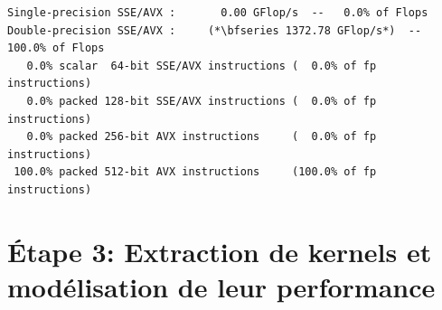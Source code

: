\begin{lstlisting}[caption=Résultat de l'outil \textit{myflops.sh} utilisé pour compter les instructions flottante exécutées sur un processeur., label={code:mygflops_512_output},
  basicstyle=\footnotesize, frame=tb,
  xleftmargin=.005\textwidth, xrightmargin=.005\textwidth]
Single-precision SSE/AVX :       0.00 GFlop/s  --   0.0% of Flops
Double-precision SSE/AVX :     (*\bfseries 1372.78 GFlop/s*)  -- 100.0% of Flops
   0.0% scalar  64-bit SSE/AVX instructions (  0.0% of fp instructions)
   0.0% packed 128-bit SSE/AVX instructions (  0.0% of fp instructions)
   0.0% packed 256-bit AVX instructions     (  0.0% of fp instructions)
 100.0% packed 512-bit AVX instructions     (100.0% of fp instructions)
\end{lstlisting}












 
 
 
 








\section{Étape 3: Extraction de kernels et modélisation de leur performance}


